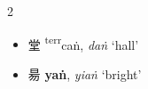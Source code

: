 \begin{multicols}{2}
\begin{itemize}







    \item {\Large{堂}} %
    {\large{{\textsuperscript{terr}}caṅ}},
    \textit{daṅ} `hall' %

\end{itemize}

\vspace{2mm}

\begin{itemize}
    \item {\Large{昜}} %
    {\large{\textbf{yaṅ}}},
    \textit{yiaṅ} `bright' %




\end{itemize}
\end{multicols}
